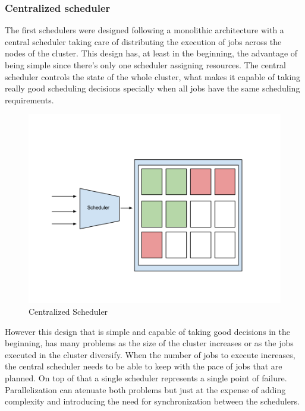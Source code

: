 \documentclass{svjour3}                     %
\begin{document}
\subsubsection{Centralized scheduler}

The first schedulers were designed following a monolithic architecture
with a central scheduler taking care of distributing the execution
of jobs across the nodes of the cluster. This design has, at least in
the beginning, the advantage of being simple since there's only one
scheduler assigning resources. The central scheduler controls the
state of the whole cluster, what makes it capable of taking really
good scheduling decisions specially when all jobs have the same
scheduling requirements. 

\begin{figure}[!ht]
  \centering
  \includegraphics[scale=0.25,natwidth=960,natheight=720]{CentralizedScheduler.png}
  \caption{Centralized Scheduler}
  \label{fig:centralized}
\end{figure}

However this design that is simple and capable of taking good
decisions in the beginning, has many problems as the size of the
cluster increases or as the jobs executed in the cluster
diversify. When the number of jobs to execute increases, the central
scheduler needs to be able to keep with the pace of jobs that are
planned. On top of that a single scheduler represents a single point
of failure. Parallelization can atenuate both problems but just at the
expense of adding complexity and introducing the need for synchronization
between the schedulers.
\end{document}
